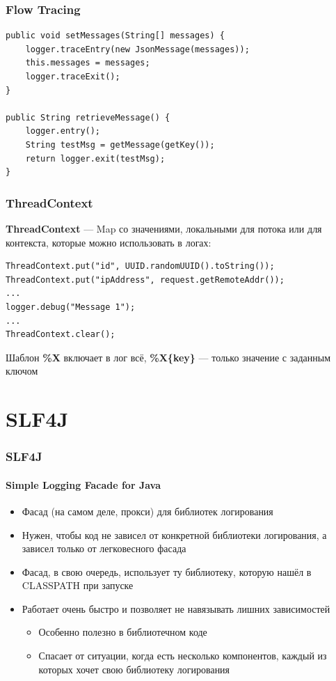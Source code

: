 \documentclass[xetex,mathserif,serif]{beamer}
\begin{document}
	\begin{frame}[fragile]
		\frametitle{Flow Tracing}
		\begin{verbatim}
public void setMessages(String[] messages) {
    logger.traceEntry(new JsonMessage(messages));
    this.messages = messages;
    logger.traceExit();
}

public String retrieveMessage() {
    logger.entry();
    String testMsg = getMessage(getKey());
    return logger.exit(testMsg);
}
		\end{verbatim}
\end{frame}

	\begin{frame}[fragile]
		\frametitle{ThreadContext}
		\textbf{ThreadContext} --- Map со значениями, локальными для потока или для контекста, которые можно использовать в логах:
		\begin{verbatim}
ThreadContext.put("id", UUID.randomUUID().toString());
ThreadContext.put("ipAddress", request.getRemoteAddr());
...
logger.debug("Message 1");
...
ThreadContext.clear();
		\end{verbatim}
		Шаблон \textbf{\%X} включает в лог всё, \textbf{\%X\{key\}} --- только значение с заданным ключом
\end{frame}

	\section{SLF4J}

	\begin{frame}
		\frametitle{SLF4J}
		\framesubtitle{Simple Logging Facade for Java}
		\begin{itemize}
			\item Фасад (на самом деле, прокси) для библиотек логирования
			\item Нужен, чтобы код не зависел от конкретной библиотеки логирования, а зависел только от легковесного фасада
			\item Фасад, в свою очередь, использует ту библиотеку, которую нашёл в CLASSPATH при запуске
			\item Работает очень быстро и позволяет не навязывать лишних зависимостей
			\begin{itemize}
				\item Особенно полезно в библиотечном коде
				\item Спасает от ситуации, когда есть несколько компонентов, каждый из которых хочет свою библиотеку логирования
			\end{itemize}
		\end{itemize}
	\end{frame}
\end{document}
